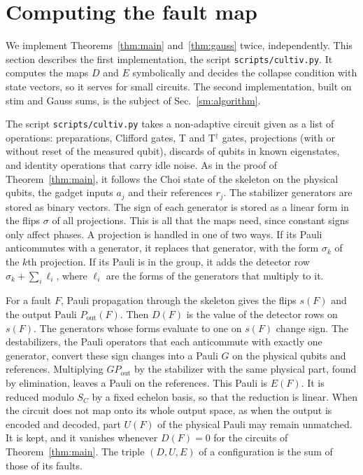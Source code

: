\documentclass[aps,prl,reprint,twocolumn,amsmath,amssymb,floatfix,nofootinbib,superscriptaddress]{revtex4-2}
\theoremstyle{definition}
\theoremstyle{remark}
\begin{document}
\section{Computing the fault map}\label{sm:compute}
We implement Theorems~\ref{thm:main} and~\ref{thm:gauss} twice, independently. This section describes the first implementation, the script \texttt{scripts/cultiv.py}. It computes the maps $D$ and $E$ symbolically and decides the collapse condition with state vectors, so it serves for small circuits. The second implementation, built on stim and Gauss sums, is the subject of Sec.~\ref{sm:algorithm}.

The script \texttt{scripts/cultiv.py} takes a non-adaptive circuit given as a list of operations: preparations, Clifford gates, T and T$^\dagger$ gates, projections (with or without reset of the measured qubit), discards of qubits in known eigenstates, and identity operations that carry idle noise. As in the proof of Theorem~\ref{thm:main}, it follows the Choi state of the skeleton on the physical qubits, the gadget inputs $a_j$ and their references $r_j$. The stabilizer generators are stored as binary vectors. The sign of each generator is stored as a linear form in the flips $\sigma$ of all projections. This is all that the maps need, since constant signs only affect phases. A projection is handled in one of two ways. If its Pauli anticommutes with a generator, it replaces that generator, with the form $\sigma_k$ of the $k$th projection. If its Pauli is in the group, it adds the detector row $\sigma_k+\sum_i\ell_i$, where $\ell_i$ are the forms of the generators that multiply to it.

For a fault $F$, Pauli propagation through the skeleton gives the flips $s(F)$ and the output Pauli $P_{\mathrm{out}}(F)$. Then $D(F)$ is the value of the detector rows on $s(F)$. The generators whose forms evaluate to one on $s(F)$ change sign. The destabilizers, the Pauli operators that each anticommute with exactly one generator, convert these sign changes into a Pauli $G$ on the physical qubits and references. Multiplying $GP_{\mathrm{out}}$ by the stabilizer with the same physical part, found by elimination, leaves a Pauli on the references. This Pauli is $E(F)$. It is reduced modulo $S_C$ by a fixed echelon basis, so that the reduction is linear. When the circuit does not map onto its whole output space, as when the output is encoded and decoded, part $U(F)$ of the physical Pauli may remain unmatched. It is kept, and it vanishes whenever $D(F)=0$ for the circuits of Theorem~\ref{thm:main}. The triple $(D,U,E)$ of a configuration is the sum of those of its faults.
\end{document}
